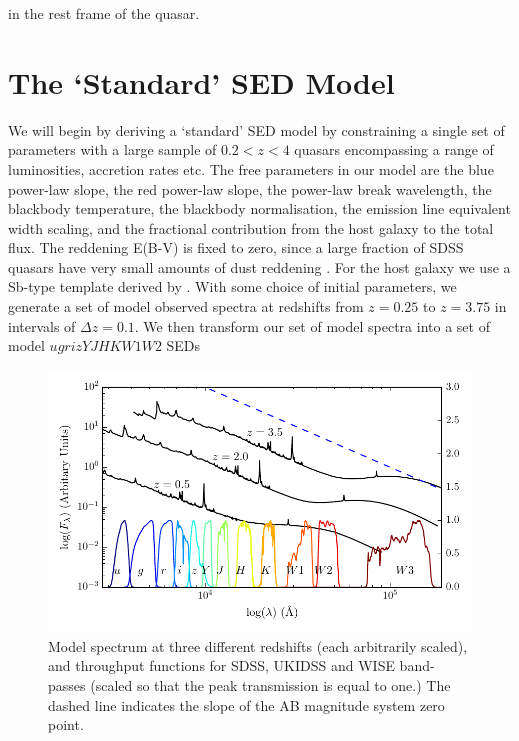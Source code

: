 in the rest frame of the quasar. 

\section{The `Standard' SED Model} 

We will begin by deriving a `standard' SED model by constraining a single set of parameters with a large sample of $0.2 < z < 4$ quasars encompassing a range of luminosities, accretion rates etc. 
The free parameters in our model are the blue power-law slope, the red power-law slope, the power-law break wavelength, the blackbody temperature, the blackbody normalisation, the emission line equivalent width scaling, and the fractional contribution from the host galaxy to the total flux. 
The reddening E(B-V) is fixed to zero, since a large fraction of SDSS quasars have very small amounts of dust reddening \citep{richards03}. 
For the host galaxy we use a Sb-type template derived by \citet{mannucci01}. 
With some choice of initial parameters, we generate a set of model observed spectra at redshifts from $z=0.25$ to $z=3.75$ in intervals of $\Delta z = 0.1$. 
We then transform our set of model spectra into a set of model $ugrizYJHKW1W2$ SEDs 

\begin{figure}
  \centering
  \includegraphics[width=\textwidth]{figures/chapter05/throughput.pdf}
  \caption{Model spectrum at three different redshifts (each arbitrarily scaled), and throughput functions for SDSS, UKIDSS and WISE band-passes (scaled so that the peak transmission is equal to one.) The dashed line indicates the slope of the AB magnitude system zero point.}
  \label{fig:filters}
\end{figure}


